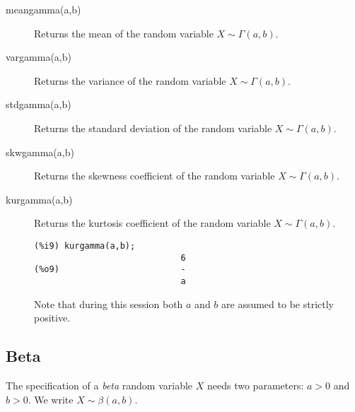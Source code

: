 \documentclass[12pt,a4paper]{article}
\begin{document}
\begin{description}
\item[meangamma(a,b)] Returns the mean of the random variable  $X \sim \Gamma(a,b)$.

\item[vargamma(a,b)] Returns the variance of the random variable  $X \sim \Gamma(a,b)$.

\item[stdgamma(a,b)] Returns the standard deviation of the random variable  $X \sim \Gamma(a,b)$.

\item[skwgamma(a,b)] Returns the skewness coefficient of the random variable  $X \sim \Gamma(a,b)$.

\item[kurgamma(a,b)] Returns the kurtosis coefficient of the random variable  $X \sim \Gamma(a,b)$.

\begin{verbatim}
(%i9) kurgamma(a,b);
                             6
(%o9)                        -
                             a
\end{verbatim}
Note that during this session both $a$ and $b$ are assumed to be strictly positive.

\end{description}

\subsection{Beta}

The specification of a \emph{beta} random variable $X$ needs two parameters: $a > 0$ and $b > 0$. We write $X \sim \beta(a,b)$.
\end{document}
